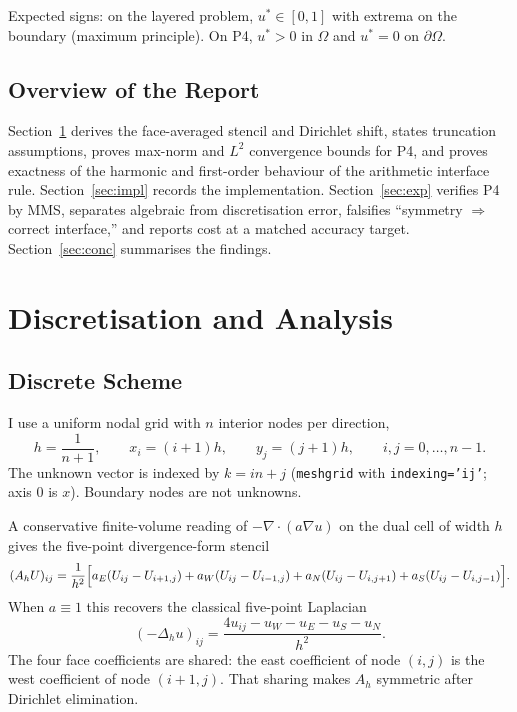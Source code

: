 \documentclass[11pt,a4paper]{article}
\begin{document}
Expected signs: on the layered problem, \(u^*\in[0,1]\) with extrema on the boundary (maximum principle).
On P4, \(u^*>0\) in \(\Omega\) and \(u^*=0\) on \(\partial\Omega\).

\subsection{Overview of the Report}
Section~\ref{sec:disc} derives the face-averaged stencil and Dirichlet shift, states truncation assumptions, proves max-norm and \(L^2\) convergence bounds for P4, and proves exactness of the harmonic and first-order behaviour of the arithmetic interface rule.
Section~\ref{sec:impl} records the implementation.
Section~\ref{sec:exp} verifies P4 by MMS, separates algebraic from discretisation error, falsifies ``symmetry \(\Rightarrow\) correct interface,'' and reports cost at a matched accuracy target.
Section~\ref{sec:conc} summarises the findings.

\section{Discretisation and Analysis}
\label{sec:disc}
\subsection{Discrete Scheme}
I use a uniform nodal grid with \(n\) interior nodes per direction,
\begin{equation}
h=\frac{1}{n+1},\qquad
x_i=(i+1)h,\qquad
y_j=(j+1)h,\qquad
i,j=0,\ldots,n-1.
\label{eq:grid}
\end{equation}
The unknown vector is indexed by \(k=i n+j\) (\texttt{meshgrid} with \texttt{indexing='ij'}; axis \(0\) is \(x\)).
Boundary nodes are not unknowns.

A conservative finite-volume reading of \(-\nabla\cdot(a\nabla u)\) on the dual cell of width \(h\) gives the five-point divergence-form stencil~\cite{leveque2007,problemPack}
\begin{equation}
(A_h U)_{ij}
=\frac{1}{h^2}\Bigl[
a_E(U_{ij}-U_{i+1,j})
+a_W(U_{ij}-U_{i-1,j})
+a_N(U_{ij}-U_{i,j+1})
+a_S(U_{ij}-U_{i,j-1})
\Bigr].
\label{eq:stencil}
\end{equation}
When \(a\equiv 1\) this recovers the classical five-point Laplacian
\[
(-\Delta_h u)_{ij}=\frac{4u_{ij}-u_W-u_E-u_S-u_N}{h^2}.
\]
The four face coefficients are shared: the east coefficient of node \((i,j)\) is the west coefficient of node \((i+1,j)\).
That sharing makes \(A_h\) symmetric after Dirichlet elimination.
\end{document}
